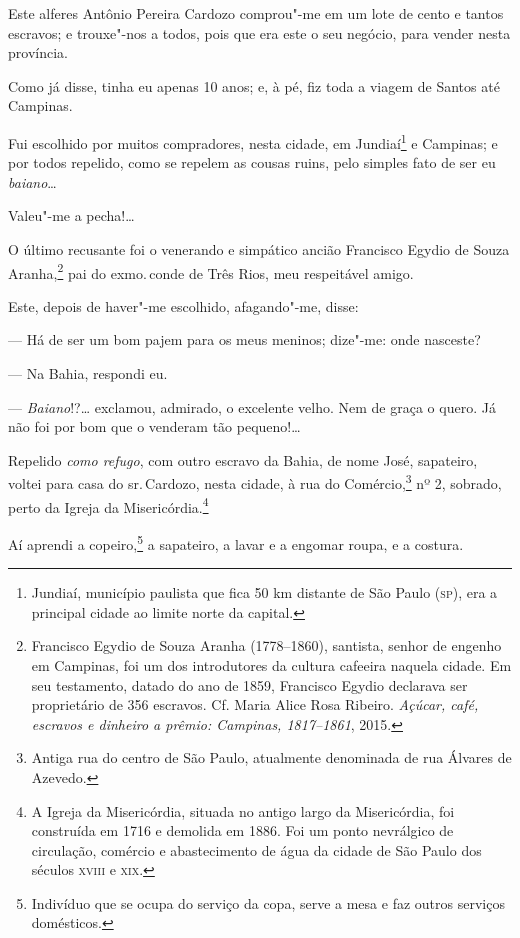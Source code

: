 Este alferes Antônio Pereira Cardozo comprou"-me em um lote de cento e
tantos escravos; e trouxe"-nos a todos, pois que era este o seu negócio,
para vender nesta província.

Como já disse, tinha eu apenas 10 anos; e, à pé, fiz toda a viagem de
Santos até Campinas.

Fui escolhido por muitos compradores, nesta cidade, em Jundiaí\footnote{
  Jundiaí, município paulista que fica 50 km distante de São Paulo (\textsc{sp}),
  era a principal cidade ao limite norte da capital.} e Campinas; e por
todos repelido, como se repelem as cousas ruins, pelo simples fato de
ser eu \emph{baiano}\ldots{}

Valeu"-me a pecha!\ldots{}

O último recusante foi o venerando e simpático ancião Francisco Egydio
de Souza Aranha,\footnote{Francisco Egydio de Souza Aranha (1778--1860),
  santista, senhor de engenho em Campinas, foi um dos introdutores
  da cultura cafeeira naquela cidade. Em seu testamento, datado do ano
  de 1859, Francisco Egydio declarava ser proprietário de 356 escravos.
  Cf. Maria Alice Rosa Ribeiro. \emph{Açúcar, café, escravos e dinheiro
  a prêmio: Campinas, 1817--1861}, 2015.} pai do exmo.\,conde de Três Rios, meu
respeitável amigo.

Este, depois de haver"-me escolhido, afagando"-me, disse:

--- Há de ser um bom pajem para os meus meninos; dize"-me: onde
nasceste?

--- Na Bahia, respondi eu.

--- \emph{Baiano}!?\ldots{} exclamou, admirado, o excelente velho. Nem de
graça o quero. Já não foi por bom que o venderam tão pequeno!\ldots{}

Repelido \emph{como refugo}, com outro escravo da Bahia, de nome José,
sapateiro, voltei para casa do sr.\,Cardozo, nesta cidade, à rua do
Comércio,\footnote{Antiga rua do centro de São Paulo, atualmente
  denominada de rua Álvares de Azevedo.} nº 2, sobrado, perto da Igreja
da Misericórdia.\footnote{A Igreja da Misericórdia, situada no antigo
  largo da Misericórdia, foi construída em 1716 e demolida em 1886. Foi
  um ponto nevrálgico de circulação, comércio e abastecimento de água da
  cidade de São Paulo dos séculos \textsc{xviii} e \textsc{xix}.}

Aí aprendi a copeiro,\footnote{Indivíduo que se ocupa do serviço da
  copa, serve a mesa e faz outros serviços domésticos.} a sapateiro, a
lavar e a engomar roupa, e a costura.


